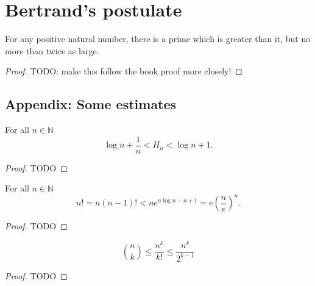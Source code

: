 \chapter{Bertrand's postulate}

\begin{theorem}
    \label{thm:bertrands_postulate}
    \leanok
    For any positive natural number, there is a prime which is greater than
    it, but no more than twice as large.
\end{theorem}
\begin{proof}
    \leanok
    TODO: make this follow the book proof more closely!
\end{proof}

\section{Appendix: Some estimates}

\begin{theorem}
    \label{thm:estimate_integral}
    \leanok
    For all \(n \in \mathbb{N}\)
    \[
    \log n + \frac 1 n < H_n < \log n + 1.
    \]
\end{theorem}
\begin{proof}
    TODO
\end{proof}


\begin{theorem}
    \label{thm:estimate_factorials}
    \leanok
    For all \(n \in \mathbb{N}\)
    \[
    n! = n(n -1)! < ne^{n \log n - n + 1}= e\left(\frac n e\right)^n.
    \]
\end{theorem}
\begin{proof}
    TODO
\end{proof}

\begin{theorem}
    \label{thm:estimate_binomial_coefficient}
    \leanok
    \[\binom{n}{k} \le \frac{n^k}{k!} \le \frac{n^k}{2^{k - 1}}\]
\end{theorem}
\begin{proof}
    TODO
\end{proof}
